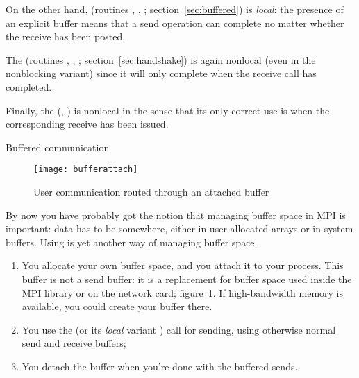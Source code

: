 On the other hand, 
(routines , ,
; section~\ref{sec:buffered})
is \emph{local}:
the presence of an explicit buffer means that a send operation
can complete no matter whether the receive has been posted.

The  
(routines , ,
; section~\ref{sec:handshake})
is again nonlocal (even in the nonblocking variant)
since it will only complete when the receive call has completed.

Finally, the 
(, )
is nonlocal in the sense that its only correct use
is when the corresponding receive has been issued.


 {Buffered communication}
\label{sec:buffered}

\begin{figure}[ht]
  \texttt{[image: bufferattach]}
  \caption{User communication routed through an attached buffer}
  \label{fig:bufattach}
\end{figure}

By now you have probably got the notion that managing buffer
space in MPI is important: data has to be somewhere, either in
user-allocated arrays or in system buffers. Using
 is yet another
way of managing buffer space.
\begin{enumerate}
\item You allocate your own buffer space, and you attach it to your
  process. This buffer is not a send buffer: it is a replacement for
  buffer space used inside the MPI library or on the network card;
  figure~\ref{fig:bufattach}. If high-bandwidth memory is available,
  you could create your buffer there.
\item You use the 
  (or its \emph{local} variant )
  call for sending, using
  otherwise normal send and receive buffers;
\item You detach the buffer when you're done with the buffered sends.
\end{enumerate}

